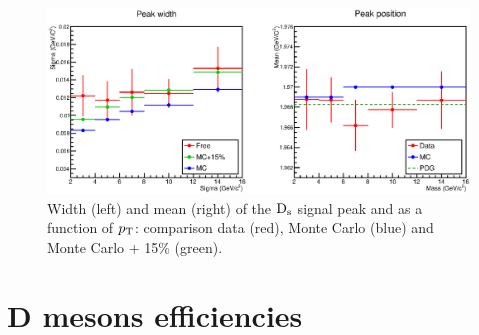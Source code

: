 \begin{figure}[!ht]
 \begin{center}
  \includegraphics[angle=0, width=15cm]{./FigCap5/MeanSigma_DataMC.eps}
 \end{center}
 \caption{Width (left) and mean (right) of the ${\rm D_s}$ signal peak and as a function of $p_{\rm T}$: comparison data (red), Monte Carlo (blue) and Monte Carlo + 15\% (green). }
 \label{MCsigmacheckDs} 
\end{figure} 

\section{D mesons efficiencies}

